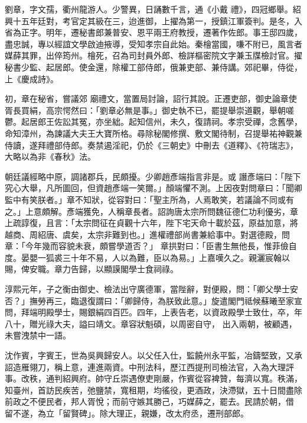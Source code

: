 \begin{pinyinscope}
 劉章，字文孺，衢州龍游人。少警異，日誦數千言，通《小戴
 禮》，四冠鄉舉。紹興十五年廷對，考官定其級在三，迨進御，上擢為第一，授鎮江軍簽判。是冬，入省為正字。明年，遷秘書郎兼普安、恩平兩王府教授，遷著作佐郎。事王邸四歲，盡忠誠，專以經誼文學啟迪掖導，受知孝宗自此始。秦檜當國，嗛不附已，風言者媒薛其罪，出倅筠州。檜死，召為司封員外郎、檢詳樞密院文字兼玉牒檢討官。擢秘書少監、起居郎。使金還，除權工部侍郎，俄兼吏部、兼侍講。郊祀畢，侍從，上《慶成詩》。



 初，章在秘省，嘗議郊
 廟禮文，當置局討論，詔行其說。正遷吏部，御史論章使胥長買絹，高宗愕然曰：「劉章必無是事。」御史執不已，罷提舉崇道觀，舉朝嗟鬱。起居郎王佐訟其冤，亦坐絀。起知信州，未久，復請祠。孝宗受禪，念舊學，命知漳州，為諫議大夫王大寶所格。尋除秘閣修撰、敷文閣待制，召提舉祐神觀兼侍讀，遂拜禮部侍郎。奏禁遏淫祀，仍於《三朝史》中刪去《道釋》、《符瑞志》，大略以為非《春秋》法。



 朝廷議經略中原，調諸郡兵，民頗擾。少卿趙彥端指言非是。或
 譖彥端曰：「陛下究心大舉，凡所圖回，但資趙彥端一笑爾。」顏端懼不測。上因夜對問章曰：「聞卿監中有笑朕者。」章不知狀，從容對曰：「聖主所為，人焉敢笑，若議論不同或有之。」上意頗解。彥端獲免，人稱章長者。詔詢唐太宗所問魏征德仁功利優劣，章上疏諄復，且言：「太宗問征在貞觀十六年，陛下宅天命十載於茲，原益加意，將越商、周紹唐、虞矣，太宗非難到也。」進權禮部尚書兼給事中。對選德殿，問章：「今年幾而容貌未衰，頗嘗學道否？」
 章拱對曰：「臣書生無他長，惟菲儉自度。晏嬰一狐裘三十年不易，人以為難，臣以為易。」上嘉嘆久之。親灑宸翰以賜，俾安職。章力告歸，以顯謨閣學士食祠祿。



 淳熙元年，子之衡由御史、檢法出守廣德軍，當陛辭，對便殿，問：「卿父學士安否？」撫勞再三，臨退復謂曰：「卿歸侍，為朕致此意。」旋遣閣門祗候蘇曦至家宣問，拜端明殿學士，賜銀絹四百匹。四年，上表告老，以資政殿學士致仕，卒，年八十，贈光祿大夫，謚曰靖文。章容狀魁碩，以周密自守，
 出入兩朝，被顧遇，未嘗洩禁中一語。



 沈作賓，字賓王，世為吳興歸安人。以父任入仕，監饒州永平監，冶鑄堅致，又承詔造雁翎刀，稱上意，連進兩資。中刑法科，歷江西提刑司檢法官，入為大理評事。改秩，通判紹興府。帥守丘崇遇僚吏剛嚴，作賓從容裨贊，每濟以寬。秩滿，知臺州，首訪民疾苦，弛鹽禁，寬租期，均徭役，更酒政，決滯獄，五十日間盡除前政之不便民者，邦人胥悅；而前守嫉其勝己，巧媒薛之，罷去。民請於朝，借
 留不遂，為立「留賢碑」。除大理正，親嫌，改太府丞，遷刑部郎。




\end{pinyinscope}
